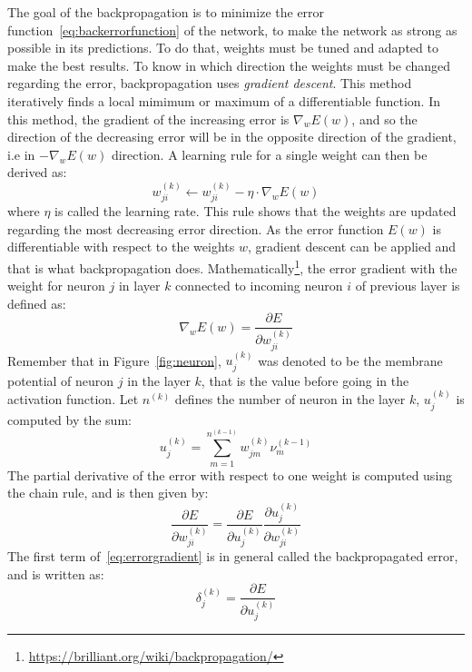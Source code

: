 The goal of the backpropagation is to minimize the error function~\eqref{eq:backerrorfunction} of the network, to make the network as strong as possible in its predictions. To do that, weights must be tuned and adapted to make the best results. To know in which direction the weights must be changed regarding the error, backpropagation uses \emph{gradient descent}. This method iteratively finds a local mimimum or maximum of a differentiable function. In this method, the gradient of the increasing error is $\nabla_w E(w)$, and so the direction of the decreasing error will be in the opposite direction of the gradient, i.e in $-\nabla_w E(w)$ direction. A learning rule for a single weight can then be derived as:
\begin{equation}
  w^{(k)}_{ji} \gets w^{(k)}_{ji} - \eta \cdot \nabla_w E(w)
\end{equation}
where $\eta$ is called the learning rate. This rule shows that the weights are updated regarding the most decreasing error direction. As the error function $E(w)$ is differentiable with respect to the weights $w$, gradient descent can be applied and that is what backpropagation does. Mathematically\footnote{\url{https://brilliant.org/wiki/backpropagation/}}, the error gradient with the weight for neuron $j$ in layer $k$ connected to incoming neuron $i$ of previous layer is defined as:
\begin{equation}
  \nabla_w E(w) = \frac{\partial E}{\partial w^{(k)}_{ji}}
\end{equation}
Remember that in Figure~\ref{fig:neuron}, $u_j^{(k)}$ was denoted to be the membrane potential of neuron $j$ in the layer $k$, that is the value before going in the activation function. Let $n^{(k)}$ defines the number of neuron in the layer $k$, $u_j^{(k)}$ is computed by the sum:
\begin{equation}
  \label{eq:layeroutput}
  u_j^{(k)} = \sum^{n^{(k-1)}}_{m=1} w^{(k)}_{jm} \nu^{(k-1)}_m
\end{equation}
The partial derivative of the error with respect to one weight is computed using the chain rule, and is then given by:
\begin{equation}
  \label{eq:errorgradient}
  \frac{\partial E}{\partial w^{(k)}_{ji}} = \frac{\partial E}{\partial u_j^{(k)}} \frac{\partial u_j^{(k)}}{\partial w^{(k)}_{ji}}
\end{equation}
The first term of~\eqref{eq:errorgradient} is in general called the backpropagated error, and is written as:
\begin{equation}
  \label{eq:errorterm}
  \delta_j^{(k)} = \frac{\partial E}{\partial u_j^{(k)}}
\end{equation}
